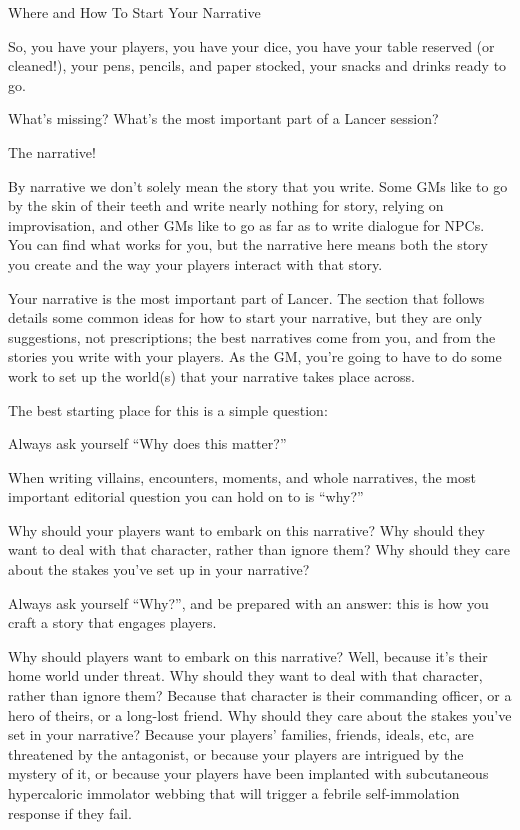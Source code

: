                           Where and How To Start Your Narrative

So, you have your players, you have your dice, you have your table reserved (or cleaned!), your
pens, pencils, and paper stocked, your snacks and drinks ready to go.


What’s missing? What’s the most important part of a Lancer session?


The narrative!





By narrative we don’t solely mean the story that you write. Some GMs like to go by the skin of
their teeth and write nearly nothing for story, relying on improvisation, and other GMs like to go
as far as to write dialogue for NPCs. You can find what works for you, but the narrative here
means both the story you create and the way your players interact with that story.


Your narrative is the most important part of Lancer. The section that follows details some
common ideas for how to start your narrative, but they are only suggestions, not prescriptions;
the best narratives come from you, and from the stories you write with your players. As the GM,
you’re going to have to do some work to set up the world(s) that your narrative takes place
across.


The best starting place for this is a simple question:


Always ask yourself  “Why does this matter?”

When writing villains, encounters, moments, and whole narratives, the most important editorial
question you can hold on to is “why?”


Why should your players want to embark on this narrative? Why should they want to deal with
that character, rather than ignore them? Why should they care about the stakes you’ve set up in
your narrative?


Always ask yourself “Why?”, and be prepared with an answer: this is how you craft a story that
engages players.


Why should players want to embark on this narrative? Well, because it’s their home world under
threat. Why should they want to deal with that character, rather than ignore them? Because that
character is their commanding officer, or a hero of theirs, or a long-lost friend. Why should they
care about the stakes you’ve set in your narrative? Because your players’ families, friends,
ideals, etc, are threatened by the antagonist, or because your players are intrigued by the
mystery of it, or because your players have been implanted with subcutaneous hypercaloric
immolator webbing that will trigger a febrile self-immolation response if they fail.


